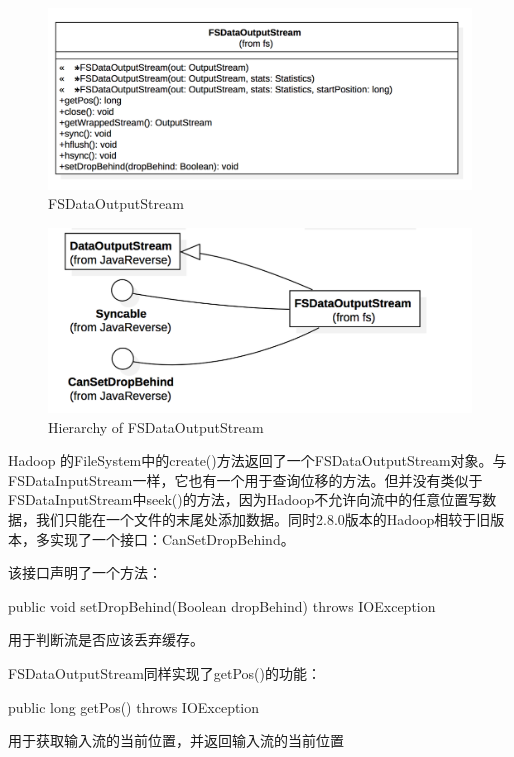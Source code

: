 \begin{figure}
\centering
\includegraphics[width =1\linewidth]{uml/outputstream/1.png}
\caption{FSDataOutputStream}
\label{fig:FSDataOutputStream}
\end{figure}

\begin{figure}
\centering
\includegraphics[width =1\linewidth]{uml/outputstream/2.png}
\caption{Hierarchy of FSDataOutputStream}
\label{fig:Hierarchy of FSDataOutputStream}
\end{figure}

Hadoop 的FileSystem中的create()方法返回了一个FSDataOutputStream对象。与FSDataInputStream一样，它也有一个用于查询位移的方法。但并没有类似于FSDataInputStream中seek()的方法，因为Hadoop不允许向流中的任意位置写数据，我们只能在一个文件的末尾处添加数据。同时2.8.0版本的Hadoop相较于旧版本，多实现了一个接口：CanSetDropBehind。

该接口声明了一个方法：
\begin{java}
public void setDropBehind(Boolean dropBehind) throws IOException
\end{java}
用于判断流是否应该丢弃缓存。

FSDataOutputStream同样实现了getPos()的功能：

\begin{java}
public long getPos() throws IOException
\end{java}
用于获取输入流的当前位置，并返回输入流的当前位置

